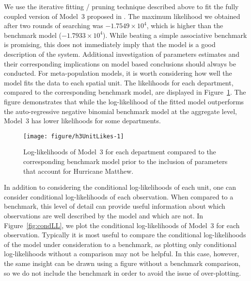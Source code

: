 We use the iterative fitting / pruning technique described above to fit the fully coupled version of Model~3 proposed in \cite{lee20}.
The maximum likelihood we obtained after two rounds of searching was $\ensuremath{-1.7549\times 10^{4}}$, which is higher than the benchmark model ($\ensuremath{-1.7933\times 10^{4}}$).
While beating a simple associative benchmark is promising, this does not immediately imply that the model is a good description of the system.
Additional investigation of parameters estimates and their corresponding implications on model based conclusions should always be conducted.
For meta-population models, it is worth considering how well the model fits the data to each spatial unit.
The likelihoods for each department, compared to the corresponding benchmark model, are displayed in Figure~\ref{fig:h3UnitLikes}.
The figure demonstrates that while the log-likelihood of the fitted model outperforms the auto-regressive negative binomial benchmark model at the aggregate level, Model~3 has lower likelihoods for some departments.

\begin{figure}[!ht]
\begin{knitrout}
\color{fgcolor}
\texttt{[image: figure/h3UnitLikes-1]} 
\end{knitrout}
\caption[Model~3 unit log-likelihoods.]{\label{fig:h3UnitLikes}Log-likelihoods of Model~3 for each department compared to the corresponding benchmark model prior to the inclusion of parameters that account for Hurricane Matthew.}
\end{figure}

In addition to considering the conditional log-likelihoods of each unit, one can consider conditional log-likelihoods of each observation.
When compared to a benchmark, this level of detail can provide useful information about which observations are well described by the model and which are not.
In Figure~\ref{fig:condLL}, we plot the conditional log-likelihoods of Model~3 for each observation.
Typically it is most useful to compare the conditional log-likelihoods of the model under consideration to a benchmark, as plotting only conditional log-likelihoods without a comparison may not be helpful.
In this case, however, the same insight can be drawn using a figure without a benchmark comparison, so we do not include the benchmark in order to avoid the issue of over-plotting.


